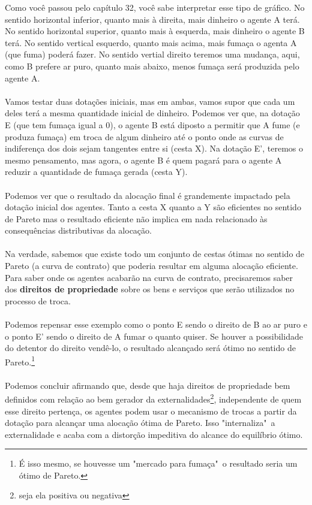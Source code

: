 \documentclass[a4paper,11pt,oneside]{book}
\theoremstyle{definition}
\theoremstyle{break}
\begin{document}
Como você passou pelo capítulo 32, você sabe interpretar esse tipo de gráfico. No sentido horizontal inferior, quanto mais à direita, mais dinheiro o agente A terá. No sentido horizontal superior, quanto mais à esquerda, mais dinheiro o agente B terá. No sentido vertical esquerdo, quanto mais acima, mais fumaça o agenta A (que fuma) poderá fazer. No sentido vertial direito teremos uma mudança, aqui, como B prefere ar puro, quanto mais abaixo, menos fumaça será produzida pelo agente A.
\\~\\
Vamos testar duas dotações iniciais, mas em ambas, vamos supor que cada um deles terá a mesma quantidade inicial de dinheiro. Podemos ver que, na dotação E (que tem fumaça igual a 0), o agente B está diposto a permitir que A fume (e produza fumaça) em troca de algum dinheiro até o ponto onde as curvas de indiferença dos dois sejam tangentes entre si (cesta X). Na dotação E', teremos o mesmo pensamento, mas agora, o agente B é quem pagará para o agente A reduzir a quantidade de fumaça gerada (cesta Y).
\\~\\
Podemos ver que o resultado da alocação final é grandemente impactado pela dotação inicial dos agentes. Tanto a cesta X quanto a Y são eficientes no sentido de Pareto mas o resultado eficiente não implica em nada relacionado às consequências distributivas da alocação.
\\~\\
Na verdade, sabemos que existe todo um conjunto de cestas ótimas no sentido de Pareto (a curva de contrato) que poderia resultar em alguma alocação eficiente. Para saber onde os agentes acabarão na curva de contrato, precisaremos saber dos \textbf{direitos de propriedade} sobre os bens e serviços que serão utilizados no processo de troca.
\\~\\
Podemos repensar esse exemplo como o ponto E sendo o direito de B ao ar puro e o ponto E' sendo o direito de A fumar o quanto quiser. Se houver a possibilidade do detentor do direito vendê-lo, o resultado alcançado será ótimo no sentido de Pareto.\footnote{É isso mesmo, se houvesse um "mercado para fumaça"\ o resultado seria um ótimo de Pareto.}
\\~\\
Podemos concluir afirmando que, desde que haja direitos de propriedade bem definidos com relação ao bem gerador da externalidades\footnote{seja ela positiva ou negativa}, independente de quem esse direito pertença, os agentes podem usar o mecanismo de trocas a partir da dotação para alcançar uma alocação ótima de Pareto. Isso "internaliza"\ a externalidade e acaba com a distorção impeditiva do alcance do equilíbrio ótimo.
\end{document}
